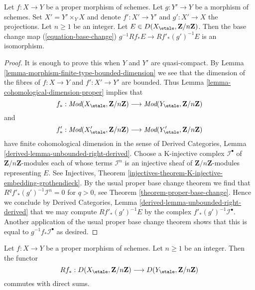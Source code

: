 \begin{lemma}
\label{lemma-proper-base-change-mod-n}
Let $f : X \to Y$ be a proper morphism of schemes. Let $g : Y' \to Y$ be
a morphism of schemes. Set $X' = Y' \times_Y X$ and denote
$f' : X' \to Y'$ and $g' : X' \to X$ the projections.
Let $n \geq 1$ be an integer.
Let $E \in D(X_\etale, \mathbf{Z}/n\mathbf{Z})$.
Then the base change map (\ref{equation-base-change})
$g^{-1}Rf_*E \to Rf'_*(g')^{-1}E$
is an isomorphism.
\end{lemma}

\begin{proof}
It is enough to prove this when $Y$ and $Y'$ are quasi-compact.
By Lemma \ref{lemma-morphism-finite-type-bounded-dimension}
we see that the dimension of the fibres of
$f : X \to Y$ and $f' : X' \to Y'$ are bounded. Thus
Lemma \ref{lemma-cohomological-dimension-proper} implies that
$$
f_* :
\textit{Mod}(X_\etale, \mathbf{Z}/n\mathbf{Z})
\longrightarrow
\textit{Mod}(Y_\etale, \mathbf{Z}/n\mathbf{Z})
$$
and
$$
f'_* :
\textit{Mod}(X'_\etale, \mathbf{Z}/n\mathbf{Z})
\longrightarrow
\textit{Mod}(Y'_\etale, \mathbf{Z}/n\mathbf{Z})
$$
have finite cohomological dimension in the sense of
Derived Categories, Lemma \ref{derived-lemma-unbounded-right-derived}.
Choose a K-injective complex $\mathcal{I}^\bullet$
of $\mathbf{Z}/n\mathbf{Z}$-modules each of whose
terms $\mathcal{I}^n$ is an injective sheaf of
$\mathbf{Z}/n\mathbf{Z}$-modules representing $E$.
See Injectives, Theorem
\ref{injectives-theorem-K-injective-embedding-grothendieck}.
By the usual proper base change theorem we find
that $R^qf'_*(g')^{-1}\mathcal{I}^n = 0$ for $q > 0$, see
Theorem \ref{theorem-proper-base-change}.
Hence we conclude by 
Derived Categories, Lemma \ref{derived-lemma-unbounded-right-derived}
that we may compute $Rf'_*(g')^{-1}E$ by the complex
$f'_*(g')^{-1}\mathcal{I}^\bullet$. Another application
of the usual proper base change theorem shows that
this is equal to $g^{-1}f_*\mathcal{I}^\bullet$ as desired.
\end{proof}

\begin{lemma}
\label{lemma-proper-mod-n-direct-sums}
Let $f : X \to Y$ be a proper morphism of schemes. Let $n \geq 1$
be an integer. Then the functor
$$
Rf_* :
D(X_\etale, \mathbf{Z}/n\mathbf{Z})
\longrightarrow
D(Y_\etale, \mathbf{Z}/n\mathbf{Z})
$$
commutes with direct sums.
\end{lemma}

